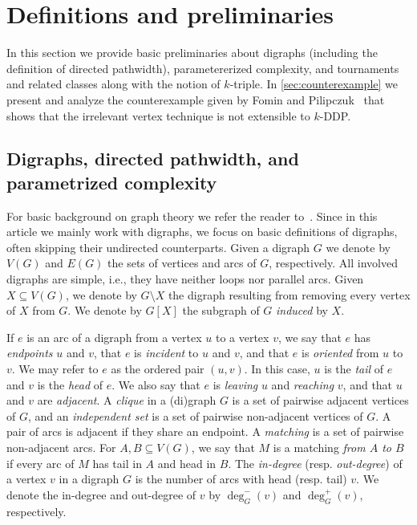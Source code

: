 \documentclass[a4paper,UKenglish,cleveref, autoref, thm-restate]{lipics-v2021}
\newcommand{\pname}[1]{{\sc #1}}
\begin{document}
  \section{Definitions and preliminaries}
\label{sec:prelim}

In this section we provide basic preliminaries about digraphs (including the definition of directed pathwidth), parametererized complexity, and tournaments and related classes along with the notion of $k$-triple. In \autoref{sec:counterexample}
we present and analyze the counterexample given by  Fomin and Pilipczuk~\cite{FominP19} that shows that the irrelevant vertex technique is not extensible to \pname{$k$-DDP}. 

\subsection{Digraphs, directed pathwidth, and parametrized complexity}
For basic background on graph theory we refer the reader to~\cite{Bondy2008}.
Since in this article we mainly work with digraphs, we focus on basic definitions of
digraphs, often skipping their undirected counterparts.
Given a digraph $G$ we denote by $V(G)$ and $E(G)$ the sets of vertices and arcs of $G$, respectively.
All involved digraphs are simple, i.e., they have neither loops nor parallel arcs.
Given $X \subseteq V(G)$, we denote by $G \setminus X$ the digraph resulting from
removing every vertex of $X$ from $G$.
We denote by $G[X]$ the subgraph of $G$ \emph{induced} by $X$.

If $e$ is an arc of a digraph from a vertex $u$ to a vertex $v$, we say that $e$ has
\emph{endpoints} $u$ and $v$, that $e$ is \emph{incident} to $u$ and $v$, and that $e$ is
\emph{oriented} from $u$ to $v$. We may refer to $e$ as the ordered pair $(u,v)$.
In this case, $u$ is the \emph{tail} of $e$ and $v$ is the \emph{head} of $e$.
We also say that $e$ is \emph{leaving} $u$ and \emph{reaching} $v$, and that $u$ and $v$
are \emph{adjacent}.
A \emph{clique} in a (di)graph $G$ is a set of pairwise adjacent vertices of $G$, and an
\emph{independent set} is a set of pairwise non-adjacent vertices of $G$.
A pair of arcs is adjacent if they share an endpoint.
A \emph{matching} is a set of pairwise non-adjacent arcs.
For $A, B \subseteq V(G)$, we say that $M$ is a matching \emph{from $A$ to $B$} if every arc of $M$ has tail in $A$ and head in $B$.
The \emph{in-degree} (resp. \emph{out-degree}) of a vertex $v$ in a digraph $G$ is the
number of arcs with head (resp. tail) $v$.
We denote the in-degree and out-degree of $v$ by $\deg^-_G(v)$ and $\deg^+_G(v)$, respectively.
\end{document}

